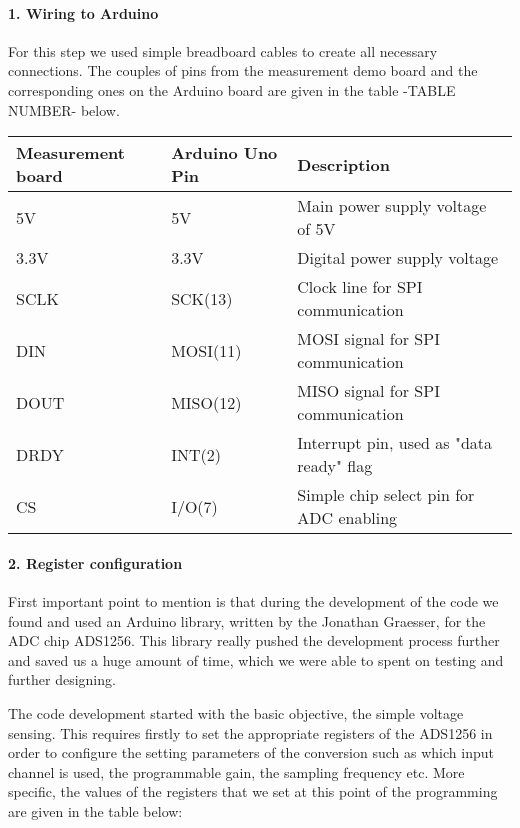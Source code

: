 \paragraph{1. Wiring to Arduino\\}
For this step we used simple breadboard cables to create all necessary connections. The couples of pins from the measurement demo board and the corresponding ones on the Arduino board are given in the table -TABLE NUMBER- below.

\begin{center}
\begin{tabular}{ l l l } 
 Measurement board & Arduino Uno Pin & Description \\ \hline
 5V & 5V & Main power supply voltage of 5V \\ 
 3.3V & 3.3V & Digital power supply voltage \\
 SCLK & SCK(13) & Clock line for SPI communication\\
 DIN & MOSI(11) & MOSI signal for SPI communication\\
 DOUT & MISO(12) & MISO signal for SPI communication\\
 DRDY & INT(2) & Interrupt pin, used as "data ready" flag\\
 CS & I/O(7) & Simple chip select pin for ADC enabling\\
\end{tabular}
\end{center}

\paragraph{2. Register configuration\\}
First important point to mention is that during the development of the code we found and used an Arduino library, written by the Jonathan Graesser, for the ADC chip ADS1256. This library really pushed the development process further and saved us a huge amount of time, which we were able to spent on testing and further designing.

The code development started with the basic objective, the simple voltage sensing. This requires firstly to set the appropriate registers of the ADS1256 in order to configure the setting parameters of the conversion such as which input channel is used, the programmable gain, the sampling frequency etc. More specific, the values of the registers that we set at this point of the programming are given in the table below:

